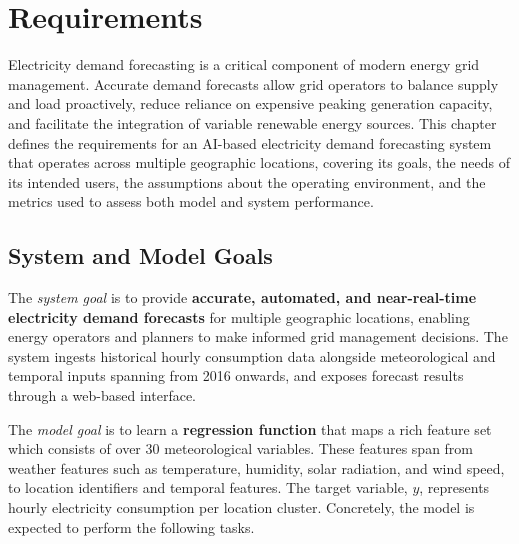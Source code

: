 \documentclass[12pt, a4paper]{report}
\begin{document}
\newpage
\listoftables
{}

\newpage
\listoffigures
{}

\newpage
\pagestyle{fancy}

\chapter{Requirements}

Electricity demand forecasting is a critical component of modern energy grid management.
Accurate demand forecasts allow grid operators to balance supply and load proactively, reduce reliance on expensive peaking generation capacity, and facilitate the integration of variable renewable energy sources.
This chapter defines the requirements for an AI-based electricity demand forecasting system that operates across multiple geographic locations, covering its goals, the needs of its intended users, the assumptions about the operating environment, and the metrics used to assess both model and system performance.

\section{System and Model Goals}

The \textit{system goal} is to provide \textbf{accurate, automated, and near-real-time electricity demand forecasts} for multiple geographic locations, enabling energy operators and planners to make informed grid management decisions.
The system ingests historical hourly consumption data alongside meteorological and temporal inputs spanning from 2016 onwards, and exposes forecast results through a web-based interface.

The \textit{model goal} is to learn a \textbf{regression function} that maps a rich feature set which consists of over 30 meteorological variables.
These features span from weather features such as temperature, humidity, solar radiation, and wind speed, to location identifiers and temporal features.
The target variable, $y$, represents hourly electricity consumption per location cluster.
Concretely, the model is expected to perform the following tasks.
\end{document}
